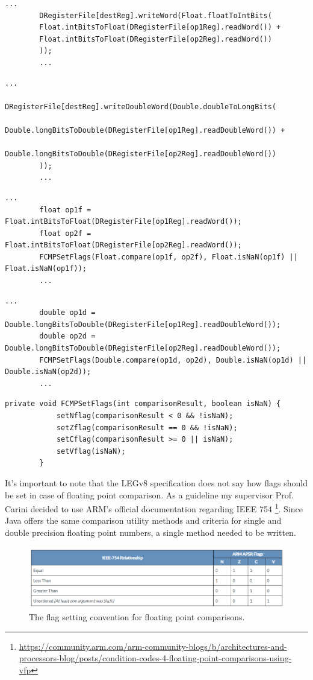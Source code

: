 	\begin{lstlisting}[caption={FADDS}]
		...
		DRegisterFile[destReg].writeWord(Float.floatToIntBits(
		Float.intBitsToFloat(DRegisterFile[op1Reg].readWord()) +
		Float.intBitsToFloat(DRegisterFile[op2Reg].readWord())
		));
		...
	\end{lstlisting}
	\begin{lstlisting}[caption={FADDD}]
		...
		DRegisterFile[destReg].writeDoubleWord(Double.doubleToLongBits(
		Double.longBitsToDouble(DRegisterFile[op1Reg].readDoubleWord()) +
		Double.longBitsToDouble(DRegisterFile[op2Reg].readDoubleWord())
		));
		...
	\end{lstlisting}
	\begin{lstlisting}[caption={FCMPS}]
		...
		float op1f = Float.intBitsToFloat(DRegisterFile[op1Reg].readWord());
		float op2f = Float.intBitsToFloat(DRegisterFile[op2Reg].readWord());
		FCMPSetFlags(Float.compare(op1f, op2f), Float.isNaN(op1f) || Float.isNaN(op1f));
		...
	\end{lstlisting}
	\begin{lstlisting}[caption={FCMPD}]
		...
		double op1d = Double.longBitsToDouble(DRegisterFile[op1Reg].readDoubleWord());
		double op2d = Double.longBitsToDouble(DRegisterFile[op2Reg].readDoubleWord());
		FCMPSetFlags(Double.compare(op1d, op2d), Double.isNaN(op1d) || Double.isNaN(op2d));
		...
	\end{lstlisting}
	\begin{lstlisting}[caption={Function for setting floating point comparison flags}]
		private void FCMPSetFlags(int comparisonResult, boolean isNaN) {
			setNflag(comparisonResult < 0 && !isNaN);
			setZflag(comparisonResult == 0 && !isNaN);
			setCflag(comparisonResult >= 0 || isNaN);
			setVflag(isNaN);
		}
	\end{lstlisting}
	
	It's important to note that the LEGv8 specification does not say how flags should be set in case of floating point comparison. As a guideline my supervisor Prof. Carini decided to use ARM's official documentation regarding IEEE 754 \footnote{\url{https://community.arm.com/arm-community-blogs/b/architectures-and-processors-blog/posts/condition-codes-4-floating-point-comparisons-using-vfp}}. Since Java offers the same comparison utility methods and criteria for single and double precision floating point numbers, a single method needed to be written.
	
	\begin{figure}[H]
		\centering
		\includegraphics[width=.8\textwidth]{img/ieee754_flags.png}
		\caption{The flag setting convention for floating point comparisons.}
	\end{figure}
	

